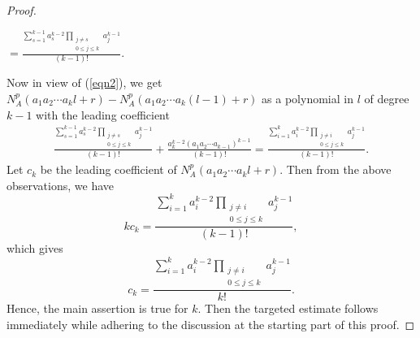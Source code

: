 \documentclass[11pt]{article}
\begin{document}
\begin{proof}
\begin{flushleft}
\end{flushleft}
\begin{flushright} 
$=\frac{\sum_{s=1}^{k-1}a_s^{k-2}\prod_{\substack{j\neq s\\ 0\leq j\leq k}}a_j^{k-1}}{(k-1)!}.\ \ \ \ \ \ \ \ \ \ \ \ $
\end{flushright}
Now in view of (\ref{eqn2}), we get $N_A^p(a_1a_2\cdots a_kl+r)-N_A^p(a_1a_2\cdots a_k(l-1)+r)$ as a polynomial in $l$ of degree $k-1$ with the leading coefficient
\begin{align*}
\frac{\sum_{s=1}^{k-1}a_s^{k-2}\prod_{\substack{j\neq s\\ 0\leq j\leq k}}a_j^{k-1}}{(k-1)!}+\frac{a_k^{k-2}(a_1a_2\cdots a_{k-1})^{k-1}}{(k-1)!}=\frac{\sum_{i=1}^{k}a_i^{k-2}\prod_{\substack{j\neq i\\ 0\leq j\leq k}}a_j^{k-1}}{(k-1)!}.
\end{align*} 
Let $c_k$ be the leading coefficient of $N_A^p(a_1a_2\cdots a_kl+r)$. Then from the above observations, we have
\[kc_k=\frac{\sum_{i=1}^{k}a_i^{k-2}\prod_{\substack{j\neq i\\ 0\leq j\leq k}}a_j^{k-1}}{(k-1)!},
\] 
which gives 
\[c_k=\frac{\sum_{i=1}^{k}a_i^{k-2}\prod_{\substack{j\neq i\\ 0\leq j\leq k}}a_j^{k-1}}{k!}.
\] 
Hence, the main assertion is true for $k$. Then the targeted estimate follows immediately while adhering to the discussion at the starting part of this proof. 
\end{proof}
\end{document}

